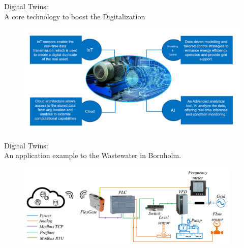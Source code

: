 \documentclass[aspectratio=169,hyperref={pdfpagelabels=false}]{beamer}
\begin{document}
\begin{frame}{\large{Digital Twins:} \\ \vspace{0.5em}
  \normalsize{A core technology to boost the Digitalization}}
\begin{figure}[h]
  \vspace{1em}
\includegraphics[width=1.05\textwidth]{img/pic7.png} \centering
\end{figure}
\end{frame}

\begin{frame}{\large{Digital Twins:} \\ \vspace{0.5em}
  \normalsize{An application example to the Wastewater in Bornholm.}}
\begin{figure}[h]
  \vspace{1em}
\includegraphics[width=0.95\textwidth]{img/Block_diagram_pump_ronne.pdf} \centering
\let\thefootnote\relax{}
\end{figure}
\end{frame}
\end{document}
